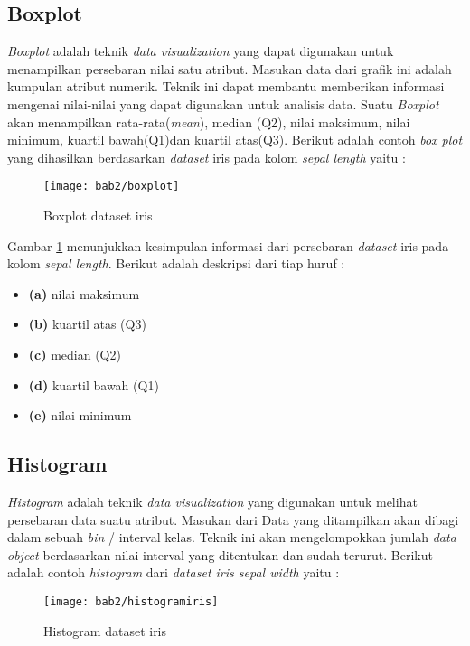 \subsection{Boxplot}	
\textit{Boxplot} adalah teknik \textit{data visualization} yang dapat digunakan untuk menampilkan persebaran nilai satu atribut. Masukan data dari grafik ini adalah kumpulan atribut numerik. Teknik ini dapat membantu memberikan informasi mengenai nilai-nilai yang dapat digunakan untuk analisis data. Suatu \textit{Boxplot} akan menampilkan rata-rata(\textit{mean}), median (Q2), nilai maksimum, nilai minimum, kuartil bawah(Q1)dan kuartil atas(Q3). Berikut adalah  contoh \textit{box plot} yang dihasilkan berdasarkan \textit{dataset} iris pada kolom \textit{sepal length} yaitu :
			
\begin{figure}[h!]
	\centering  
	\texttt{[image: bab2/boxplot]}   
	\caption{Boxplot dataset iris}
	\label{fig:boxplot} 
\end{figure} 
 Gambar \ref{fig:boxplot} menunjukkan kesimpulan informasi dari persebaran \textit{dataset} iris pada kolom \textit{sepal length}. Berikut adalah deskripsi dari tiap huruf : 
	 	\begin{itemize}
	 	\item \textbf{(a)} nilai maksimum 
	 	\item \textbf{(b)} kuartil atas (Q3) 
	 	\item \textbf{(c)} median (Q2) 
	 	\item \textbf{(d)} kuartil bawah (Q1)
	 	\item \textbf{(e)} nilai minimum 
	 	\end{itemize}
\pagebreak 	

\subsection{Histogram} 
 \textit{Histogram} adalah teknik \textit{data visualization} yang digunakan untuk melihat persebaran data suatu atribut. Masukan dari  Data yang ditampilkan akan dibagi dalam sebuah \textit{bin} / interval kelas. Teknik ini akan mengelompokkan jumlah \textit{data object} berdasarkan nilai interval yang ditentukan dan sudah terurut. Berikut adalah contoh \textit{histogram} dari \textit{dataset iris sepal width} yaitu :
	 	
	 	   	
\begin{figure}[h!]
	\centering  
	\texttt{[image: bab2/histogramiris]}   
	\caption{Histogram dataset iris}
	\label{fig:histogram} 
\end{figure} 
	
